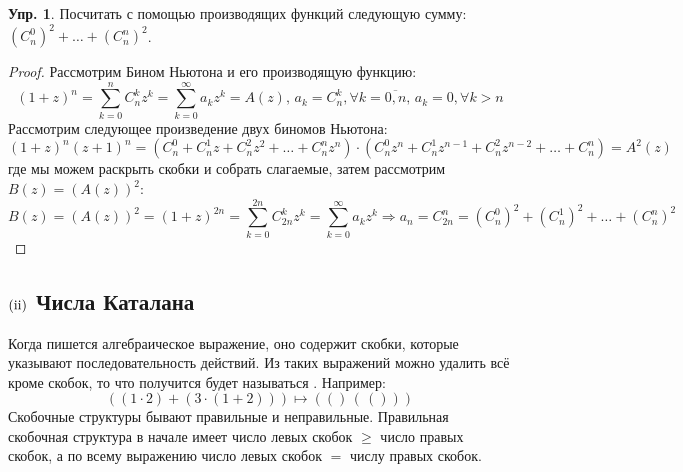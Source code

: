 \documentclass[12pt]{article}
\newcommand{\RN}[1]{%
	\textup{\uppercase\expandafter{\romannumeral#1}}%
}
\theoremstyle{definition}
\newtheorem{exrc}{Упр.}
\newcommand{\ddsum}[2]{\displaystyle\sum\limits_{#1}^{#2}}
\begin{document}
\begin{exrc}
	Посчитать с помощью производящих функций следующую сумму: $(C_n^0)^2 + \dotsc + (C_n^n)^2$.
\end{exrc}
\begin{proof}
	Рассмотрим Бином Ньютона и его производящую функцию:
	$$
		(1 + z)^n = \ddsum{k = 0}{n}C_n^k z^k = \ddsum{k = 0}{\infty}a_k z^k = A(z), \,  a_k = C_n^k, \forall k = \overline{0,n}, \, a_k = 0, \forall k > n
	$$
	Рассмотрим следующее произведение двух биномов Ньютона:
	$$
		(1 + z)^n(z + 1)^n = (C_n^0 + C_n^1 z + C_n^2 z^2 + \dotsc + C_n^n z^n){\cdot}(C_n^0z^n + C_n^1 z^{n-1} + C_n^2 z^{n-2}  + \dotsc + C_n^n ) = A^2(z)
	$$
	где мы можем раскрыть скобки и собрать слагаемые, затем рассмотрим $B(z) = (A(z))^2$:
	$$
		B(z) = (A(z))^2 = (1 + z)^{2n} = \ddsum{k = 0}{2n}C_{2n}^k z^k = \ddsum{k = 0}{\infty}a_k z^k \Rightarrow a_n = C_{2n}^n = (C_n^0)^2 + (C_n^1)^2 + \dotsc + (C_n^n)^2
	$$
\end{proof}
\newpage
\subsection*{$(\RN{2})$ Числа Каталана}
Когда пишется алгебраическое выражение, оно содержит скобки, которые указывают последовательность действий. Из таких выражений можно удалить всё кроме скобок, то что получится будет называться . Например:
$$
	((1{\cdot}2) + (3{\cdot}(1 + 2))) \mapsto (() \, (\, ()))
$$
Скобочные структуры бывают правильные и неправильные. Правильная  скобочная структура в начале имеет число левых скобок $\geq$ число правых скобок, а по всему выражению число левых скобок $=$ числу правых скобок. 
\end{document}
